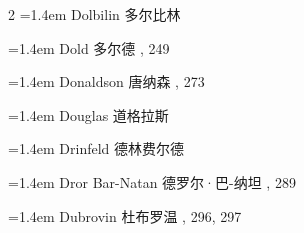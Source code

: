 \begin{multicols}{2}
\noindent\hangindent=1.4em Dolbilin \quad 多尔比林 \par
\noindent\hangindent=1.4em Dold \quad 多尔德 , 249\par
\noindent\hangindent=1.4em Donaldson \quad 唐纳森 , 273\par
\noindent\hangindent=1.4em Douglas \quad 道格拉斯 \par
\noindent\hangindent=1.4em Drinfeld \quad 德林费尔德 \par
\noindent\hangindent=1.4em Dror Bar-Natan \quad 德罗尔·巴-纳坦 , 289\par
\noindent\hangindent=1.4em Dubrovin \quad 杜布罗温 , 296, 297\par
\end{multicols}

